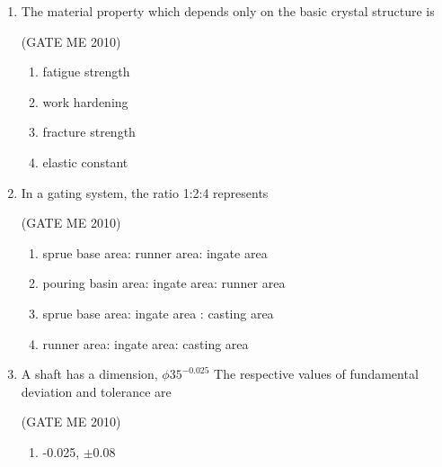 \documentclass[journal,12pt,onecolumn]{IEEEtran}
\theoremstyle{remark}
\begin{document}
\begin{enumerate}
 \hfill{(GATE ME 2010)}
 
\begin{multicols}{4}
    \begin{enumerate}
        \item 177
\item 354
\item 500
\item 707
    \end{enumerate}
\end{multicols}

\item The material property which depends only on the basic crystal structure is

 \hfill{(GATE ME 2010)}
 
\begin{multicols}{2}
    \begin{enumerate}
        \item  fatigue strength
\item work hardening
\item  fracture strength
\item  elastic constant
    \end{enumerate}
\end{multicols}

\item In a gating system, the ratio 1:2:4 represents

 \hfill{(GATE ME 2010)}
 
    \begin{enumerate}
        \item  sprue base area: runner area: ingate area
\item pouring basin area: ingate area: runner area
\item sprue base area: ingate area : casting area
\item runner area: ingate area: casting area
    \end{enumerate}
 



\item A shaft has a dimension, $\phi35^{-0.025}$ \; The respective values of fundamental deviation and tolerance are

 \hfill{(GATE ME 2010)}

\begin{multicols}{2}
\begin{enumerate}

\item  -0.025, $\pm{0.08}$


\end{enumerate}
\end{multicols}
\end{enumerate}
\end{document}
